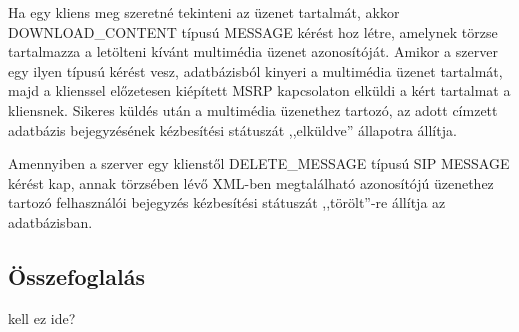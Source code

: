 Ha egy kliens meg szeretné tekinteni az üzenet tartalmát, akkor DOWNLOAD\_CONTENT típusú MESSAGE kérést hoz létre, amelynek törzse tartalmazza a letölteni kívánt multimédia üzenet azonosítóját. Amikor a szerver egy ilyen típusú kérést vesz, adatbázisból kinyeri a multimédia üzenet tartalmát, majd a klienssel előzetesen kiépített MSRP kapcsolaton elküldi a kért tartalmat a kliensnek. Sikeres küldés után a multimédia üzenethez tartozó, az adott címzett adatbázis bejegyzésének kézbesítési státuszát ,,elküldve'' állapotra állítja.

Amennyiben a szerver egy klienstől DELETE\_MESSAGE típusú SIP MESSAGE kérést kap, annak törzsében lévő XML-ben megtalálható azonosítójú üzenethez tartozó felhasználói bejegyzés kézbesítési státuszát ,,törölt''-re állítja az adatbázisban.  


\subsection{Összefoglalás}

{\color{red} kell ez ide?}
